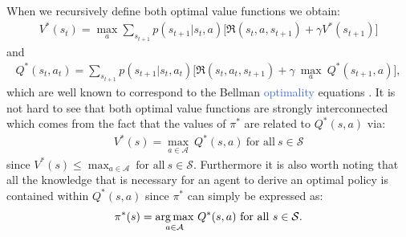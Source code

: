 When we recursively define both optimal value functions we obtain:
\begin{align}
    V^{*}(s_t) = \underset{a}{\max}\sum_{s_{t+1}}p(s_{t+1} | s_{t}, a) \bigg[\Re (s_{t}, a, s_{t+1}) + \gamma V^{*}(s_{t+1}) \bigg]
    \label{eq:optimal_v}
\end{align}
and
\begin{multline}
    Q^{*}(s_t,a_t)=\sum_{s_{t+1}}p(s_{t+1} | s_{t}, a_{t})  \bigg[\Re (s_{t}, a_{t}, s_{t+1}) + \gamma \: \underset{a}{\max} \: Q^{*}(s_{t+1}, a) \bigg],
    \label{eq:optimal_q}
\end{multline}
which are well known to correspond to the Bellman \textcolor{RoyalBlue}{optimality} equations \cite{bellman1966dynamic}. It is not hard to see that both optimal value functions are strongly interconnected which comes from the fact that the values of $\pi^{*}$ are related to $Q^{*}(s,a)$ via:
\begin{align}
	V^{*}(s) = \underset{a\in\mathcal{A}}{\max} \ Q^{*}(s,a) \ \text{for all} \ s \in \mathcal{S}
\end{align}
since $V^{*}(s) \leq \max_{a\in\mathcal{A}} \ \text{for all} \ s\in\mathcal{S}$. Furthermore it is also worth noting that all the knowledge that is necessary for an agent to derive an optimal policy is contained within $Q^{*}(s,a)$ since $\pi^{*}$ can simply be expressed as:
\begin{equation}
	\pi^{*}(s) = \underset{a\in\mathcal{A}}{\operatorname*{arg\,max}} \ Q^{*}(s,a) \ \text{for all} \ s \in \mathcal{S}.
\end{equation}


